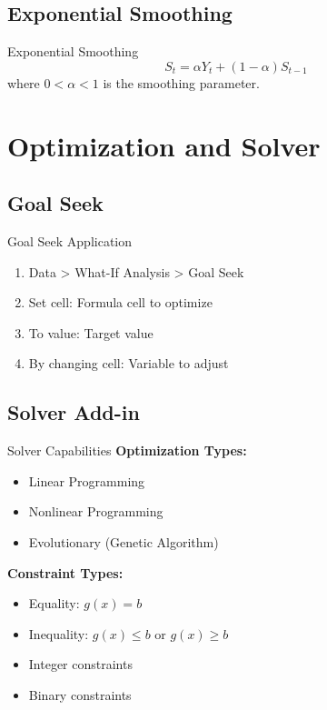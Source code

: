\documentclass[12pt,a4paper]{book}
\begin{document}
{{\subsection{Exponential Smoothing}

\begin{definition}{Exponential Smoothing}
\[
S_t = \alpha Y_t + (1-\alpha) S_{t-1}
\]
where $0 < \alpha < 1$ is the smoothing parameter.
\end{definition}

\section{Optimization and Solver}

\subsection{Goal Seek}

\begin{example}{Goal Seek Application}
\begin{enumerate}
    \item Data > What-If Analysis > Goal Seek
    \item Set cell: Formula cell to optimize
    \item To value: Target value
    \item By changing cell: Variable to adjust
\end{enumerate}
\end{example}

\subsection{Solver Add-in}

\begin{definition}{Solver Capabilities}
\textbf{Optimization Types:}
\begin{itemize}
    \item Linear Programming
    \item Nonlinear Programming
    \item Evolutionary (Genetic Algorithm)
\end{itemize}

\textbf{Constraint Types:}
\begin{itemize}
    \item Equality: $g(x) = b$
    \item Inequality: $g(x) \leq b$ or $g(x) \geq b$
    \item Integer constraints
    \item Binary constraints
\end{itemize}
\end{definition}

}}
\end{document}

